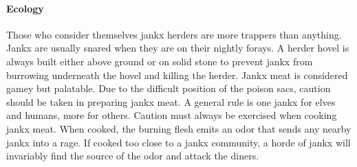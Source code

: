 \paragraph{Ecology}
Those who consider themselves jankx herders are
more trappers than anything. Jankx are usually snared when
they are on their nightly forays. A herder hovel is always built
either above ground or on solid stone to prevent jankx from
burrowing underneath the hovel and killing the herder. Jankx
meat is considered gamey but palatable. Due to the difficult
position of the poison sacs, caution should be taken in preparing
jankx meat. A general rule is one jankx for elves and humans,
more for others. Caution must always be exercised when cooking
jankx meat. When cooked, the burning flesh emits an odor
that sends any nearby jankx into a rage. If cooked too close to a
jankx community, a horde of jankx will invariably find the
source of the odor and attack the diners.

